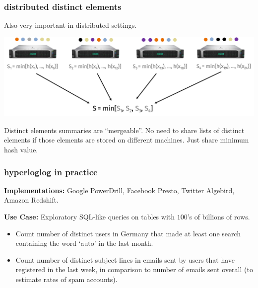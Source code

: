 \documentclass[handout,compress]{beamer}
\begin{document}
\begin{frame}
	\frametitle{distributed distinct elements}
	Also very important in distributed settings. 
	\begin{center}
		\includegraphics[width=\textwidth]{dist_min_hash.png}
	\end{center}

	Distinct elements summaries are ``mergeable''. No need to share lists of distinct elements if those elements are stored on different machines. Just share minimum hash value.
\end{frame}

\begin{frame}
	\frametitle{hyperloglog in practice}
	\small
	\textbf{Implementations:} Google PowerDrill, Facebook Presto, Twitter Algebird, Amazon Redshift.
	
	\textbf{Use Case:} Exploratory SQL-like queries on tables with $100$'s of billions of rows.
	\begin{itemize}
		\item \alert{Count} number of \alert{distinct} users in Germany that  made at least one search containing the word `auto' in the last month.
		\item \alert{Count} number of \alert{distinct} subject lines in emails sent by users that have registered in the last week, in comparison to number of emails sent overall (to estimate rates of spam accounts).
	\end{itemize}
\end{frame}

%	

\end{document}
